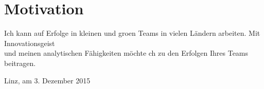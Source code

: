 \documentclass[11pt,a4paper,sans]{moderncv}
\begin{document}
\cvline{}{}{}


\section{Motivation}

% 

Ich kann auf Erfolge in kleinen und gro{\upshape{\ss}}en
Teams in vielen L\"{a}ndern arbeiten. Mit Innovationsgeist \\
und meinen
analytischen F\"{a}higkeiten m\"{o}chte ch zu den Erfolgen Ihres Teams
beitragen.\\

 \cvline{}{}{}

Linz, am 3. Dezember 2015
\end{document}
